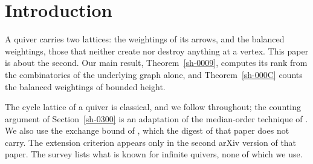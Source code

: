 \section{Introduction}\label{sh-0100}

A quiver carries two lattices: the weightings of its arrows, and the balanced weightings, those that neither create nor destroy anything at a vertex. This paper is about the second. Our main result, Theorem~\ref{sh-0009}, computes its rank from the combinatorics of the underlying graph alone, and Theorem~\ref{sh-000C} counts the balanced weightings of bounded height.

The cycle lattice of a quiver is classical, and we follow \cite[Proposition 2.1]{Arden24} throughout; the counting argument of Section~\ref{sh-0300} is an adaptation of the median-order technique of \cite[Theorem 2.3]{Bellamy19}. We also use the exchange bound of \cite[Lemma 5.9]{Arden24}, which the digest of that paper does not carry. The extension criterion \cite[Theorem 5.1]{Arden24} appears only in the second arXiv version of that paper. The survey \cite{Cortez07} lists what is known for infinite quivers, none of which we use.


